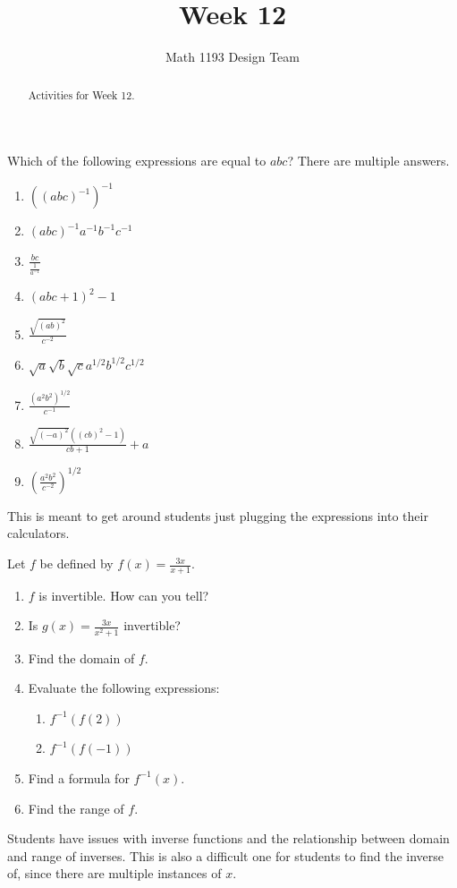 \documentclass[noauthor]{ximera}
\title{Week 12}
\author{Math 1193 Design Team}
\begin{document}
\begin{abstract}
    Activities for Week 12.
\end{abstract}
\maketitle
 
\begin{problem}
Which of the following expressions are equal to \(abc\)? There are multiple
answers.
\begin{enumerate}
    \item \(\left((abc)^{-1}\right)^{-1}\)
    \item \((abc)^{-1}a^{-1}b^{-1}c^{-1}\)
    \item \(\frac{bc}{\frac{1}{a^{-1}}}\)
    \item \((abc + 1)^2 - 1\)
    \item \(\frac{\sqrt{(ab)^2}}{c^{-2}}\)
    \item \(\sqrt{a}\sqrt{b}\sqrt{c}a^{1/2}b^{1/2}c^{1/2}\)
    \item \(\frac{(a^{2}b^{2})^{1/2}}{c^{-1}}\)
    \item \(\frac{\sqrt{(-a)^2}((cb)^2 - 1)}{cb + 1} + a\)
    \item \(\left(\frac{a^2b^2}{c^{-2}}\right)^{1/2}\)
\end{enumerate}
\begin{instructorNotes}
    This is meant to get around students just plugging the expressions into their calculators.
\end{instructorNotes}
\end{problem}
 
\begin{problem}
Let \(f\) be defined by \(f(x) = \frac{3x}{x + 1}\).
 
\begin{enumerate}
\item \(f\) is invertible. How can you tell?
\item Is \(g(x) = \frac{3x}{x^2 + 1}\) invertible?
\item Find the domain of \(f\).
\item Evaluate the following expressions:
\begin{enumerate}
    \item \(f^{-1}(f(2))\)
    \item \(f^{-1}(f(-1))\)
\end{enumerate}
\item Find a formula for \(f^{-1}(x)\).
\item Find the range of \(f\).
\end{enumerate}
 
\begin{instructorNotes}
    Students have issues with inverse functions and the relationship between domain and range of inverses.
    This is also a difficult one for students to find the inverse of, since there are multiple instances of \(x\).
\end{instructorNotes}
\end{problem}
 
\end{document}
